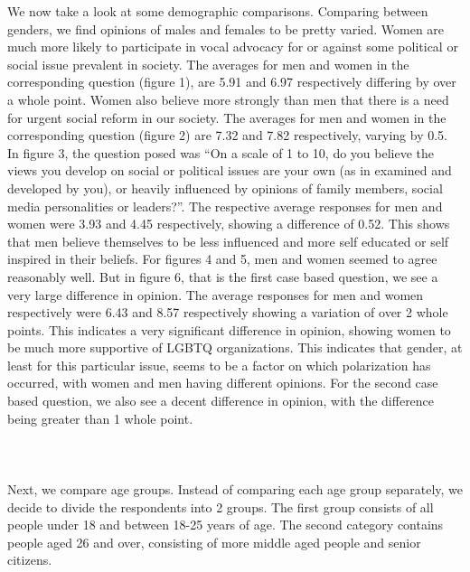 \documentclass{article}
\begin{document}
We now take a look at some demographic comparisons.
Comparing between genders, we find opinions of males and females to be pretty varied. 
Women are much more likely to participate in vocal advocacy for or against some political or social issue prevalent in society. The averages for men and women in the corresponding question (figure 1), are 5.91 and 6.97 respectively differing by over a whole point. 
Women also believe more strongly than men that there is a need for urgent social reform in our society. The averages for men and women in the corresponding question (figure 2) are 7.32 and 7.82 respectively, varying by 0.5.
In figure 3, the question posed was “On a scale of 1 to 10, do you believe the views you develop on social or political issues are your own (as in examined and developed by you), or heavily influenced by opinions of family members, social media personalities or leaders?”. The respective average responses for men and women were 3.93 and 4.45 respectively, showing a difference of 0.52. This shows that men believe themselves to be less influenced and more self educated or self inspired in their beliefs.
For figures 4 and 5, men and women seemed to agree reasonably well. But in figure 6, that is the first case based question, we see a very large difference in opinion. The average responses for men and women respectively were 6.43 and 8.57 respectively showing a variation of over 2 whole points. This indicates a very significant difference in opinion, showing women to be much more supportive of LGBTQ organizations. This indicates that gender, at least for this particular issue, seems to be a factor on which polarization has occurred, with women and men having different opinions.
For the second case based question, we also see a decent difference in opinion, with the difference being greater than 1 whole point. \\ \\
\\
\\
Next, we compare age groups.
Instead of comparing each age group separately, we decide to divide the respondents into 2 groups. The first group consists of all people under 18 and between 18-25 years of age. The second category contains people aged 26 and over, consisting of more middle aged people and senior citizens.
\end{document}
